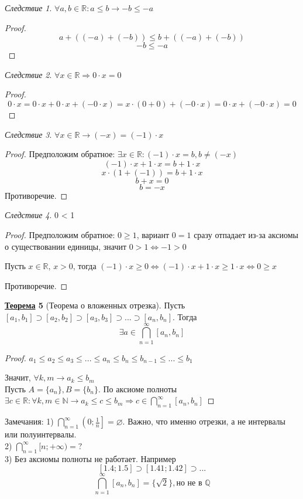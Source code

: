 \documentclass[12pt]{article}
\def\R{\mathbb{R}}       %
\def\SO{\Rightarrow}     %
\def\EQ{\Leftrightarrow} %
\theoremstyle{definition} %
\newtheorem{Thm}{\underline{Теорема}}[subsection] %
\theoremstyle{plain} %
\theoremstyle{remark} %
\newtheorem{Cons}[Thm]{Следствие} %
\begin{document}
\begin{Cons}
	$\forall a, b \in \R: a \leq b \rightarrow -b \leq -a$
	\begin{proof}
		$$a + ((-a) + (-b)) \leq b + ((-a) + (-b))$$
		$$-b \leq -a$$
	\end{proof}
\end{Cons}

\begin{Cons}
	$\forall x \in \R \SO 0 \cdot x = 0$
	\begin{proof}
		$$0 \cdot x = 0 \cdot x + 0 \cdot x + (-0\cdot x) = x \cdot (0 + 0) + (-0 \cdot x) = 0 \cdot x + (-0\cdot x) = 0$$
	\end{proof}
\end{Cons}

\begin{Cons}
	$\forall x \in \R \rightarrow (-x) = (-1) \cdot x$
	\begin{proof}
		Предположим обратное: $\exists x \in \R: (-1) \cdot x = b, b \neq (-x)$
		$$(-1) \cdot x + 1 \cdot x = b + 1 \cdot x$$
		$$x \cdot (1 + (-1)) = b + 1 \cdot x$$
		$$b + x = 0$$
		$$b = -x$$
		Противоречие.
	\end{proof}
\end{Cons}

\begin{Cons}
	0 < 1
	\begin{proof}
		Предположим обратное: $0 \geq 1$, вариант $0 = 1$ сразу отпадает из-за аксиомы о существовании единицы, значит $0 > 1 \EQ -1 > 0$
		
		Пусть $x \in \R$, $x > 0$, тогда $(-1) \cdot x \geq 0 \EQ (-1) \cdot x + 1 \cdot x \geq 1 \cdot x \EQ 0 \geq x$
		
		Противоречие.
	\end{proof}
\end{Cons}

\begin{Thm}[Теорема о вложенных отрезка]
    Пусть $[a_1, b_1] \supset [a_2, b_2] \supset [a_3, b_3] \supset ... \supset [a_n, b_n]$. Тогда $$\exists a \in \bigcap_{n = 1}^{\infty}[a_n, b_n]$$
\end{Thm}

\begin{proof}
    $a_1 \leqslant a_2 \leqslant a_3 \leqslant ... \leqslant a_n \leqslant b_n \leqslant b_{n - 1} \leqslant ... \leqslant b_1$
    
    Значит, $\forall k, m \to a_k \leqslant b_m$ \\
    Пусть $A = \{a_n\}, B = \{b_n\}$. По аксиоме полноты $\exists c \in \mathbb{R} : \forall k, m \in \mathbb{N} \to a_k \leqslant c \leqslant b_m \Rightarrow c \in \bigcap_{n = 1}^{\infty} [a_n, b_n]$  
\end{proof}
Замечания: 1) $\bigcap_{n = 1}^{\infty} \left(0; \frac{1}{n}\right] = \varnothing$. Важно, что именно отрезки, а не интервалы или полуинтервалы.  \\
2) $\bigcap_{n = 1}^{\infty} [n; +\infty) = ?$ \\
3) Без аксиомы полноты не работает. Например 
\[[1.4; 1.5] \supset [1.41; 1.42] \supset ...\]
\[\bigcap_{n = 1}^{\infty}[a_n, b_n] = \{\sqrt{2}\}, \text{но не в } \mathbb{Q}\]
\end{document}
